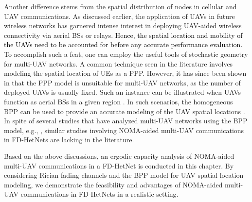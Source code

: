 Another difference stems from the spatial distribution of nodes in cellular and UAV communications. As discussed earlier, the application of UAVs in future wireless networks has garnered intense interest in deploying UAV-aided wireless connectivity via aerial BSs or relays. \textcolor{black}{Hence, the spatial location and mobility of the UAVs  need to be accounted for before any accurate performance evaluation}. To accomplish such a feat, one can employ the useful tools of stochastic geometry for multi-UAV networks. A common technique seen in the literature involves modeling the spatial location of UEs as a PPP. However, it has since been shown in \cite{chetlur2017downlink} that the PPP model is unsuitable for multi-UAV networks, as the number of deployed UAVs is usually fixed. Such an instance can be illustrated when UAVs function as aerial BSs in a given region \cite{chetlur2017downlink,wang2018modeling}. In such scenarios, the homogeneous BPP can be used to provide an accurate modeling of the UAV spatial locations \cite{chetlur2017downlink,wang2018modeling}. In spite of several studies that have analyzed multi-UAV networks using the BPP model, e.g., \cite{chetlur2017downlink,wang2018modeling,enayati2019moving}, similar studies involving NOMA-aided multi-UAV communications in FD-HetNets are lacking in the literature.

Based on the above discussions, an ergodic capacity analysis of NOMA-aided multi-UAV communications in a FD-HetNet is conducted in this chapter. By considering Rician fading channels and the BPP model for UAV spatial location modeling, we demonstrate the feasibility and advantages of NOMA-aided multi-UAV communications in FD-HetNets in a realistic setting. 


